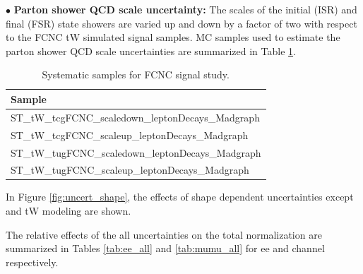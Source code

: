    $\bullet$ \textbf{Parton shower QCD scale uncertainty:} The scales of the initial (ISR) and final (FSR) state showers are varied up and down by a factor of two with respect to the FCNC tW simulated signal samples. MC samples used to estimate the parton shower QCD scale uncertainties are summarized in Table \ref{sysFCNC}.

\begin{table}[h]
\centering
\begin{tabular}{l}
\hline
Sample                                                  \\
\hline
\hline
ST\_tW\_tcgFCNC\_scaledown\_leptonDecays\_Madgraph                \\
ST\_tW\_tcgFCNC\_scaleup\_leptonDecays\_Madgraph                \\
ST\_tW\_tugFCNC\_scaledown\_leptonDecays\_Madgraph               \\
ST\_tW\_tugFCNC\_scaleup\_leptonDecays\_Madgraph                \\
\hline
\end{tabular}
\caption{Systematic samples for FCNC signal study.}
\label{sysFCNC}
\end{table}




In Figure \ref{fig:uncert_shape}, the effects of shape dependent uncertainties except \ttbar and tW modeling are shown.

The relative effects of the all uncertainties on the total normalization are summarized in Tables \ref{tab:ee_all} and \ref{tab:mumu_all} for ee and \mumu channel respectively.

